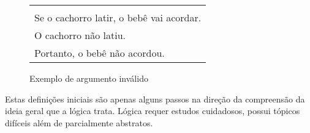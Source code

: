 \begin{figure}[!tbh]
\label{fig:exemplo_arg_invalido}
    \centering
    {
        \begin{tabular}{|l|}
            \hline \\
            Se o cachorro latir, o bebê vai acordar. \\
            O cachorro não latiu.\\
            Portanto, o bebê não acordou.\\
            \hline
        \end{tabular}
    }
    \caption{Exemplo de argumento inválido}
\end{figure}

Estas definições iniciais são apenas alguns passos na direção da compreensão da
ideia geral que a lógica trata. Lógica requer estudos cuidadosos, possui 
tópicos difíceis além de parcialmente abstratos.
